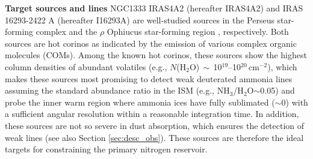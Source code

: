 \documentclass[12pt,a4paper]{article}  %
\begin{document}



\noindent \textbf{Target sources and lines} \quad NGC1333 IRAS4A2 (hereafter IRAS4A2) and IRAS 16293-2422 A (hereafter I16293A) are well-studied sources in the Perseus star-forming complex \citep[$\sim$300\,pc;][]{Zucker18} and the $\rho$ Ophiucus star-forming region \citep[$\sim$140\,pc;][]{Dzib18}, respectively. Both sources are hot corinos as indicated by the emission of various complex organic molecules (COMs).
Among the known hot corinos, these sources show the highest column densities of abundant volatiles (e.g., $N$(H$_2$O)$\,\sim\,$10$^{19}$--10$^{20}$\,cm$^{-2}$), which makes these sources most promising to detect weak deuterated ammonia lines assuming the standard abundance ratio in the ISM (e.g., NH$_3$/H$_2$O$\sim$0.05) and probe the inner warm region where ammonia ices have fully sublimated ($\sim$0) with a sufficient angular resolution within a reasonable integration time. In addition, these sources are not so severe in dust absorption, which ensures the detection of weak lines (see also Section \ref{sec:desc_obs}). 
These sources are therefore the ideal targets for constraining the primary nitrogen reservoir.
\end{document}
